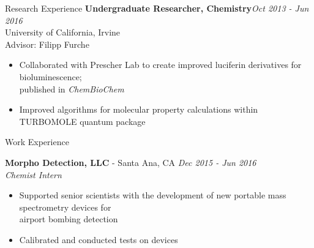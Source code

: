 \documentclass{resume} %
\begin{document}
\begin{rSection}{Research Experience}
\textbf{Undergraduate Researcher, Chemistry}\hfill {\em Oct 2013 - Jun 2016}\\
University of California, Irvine\\
Advisor: Filipp Furche
\vspace{-0.5em}
\begin{itemize}
\itemsep-0.65em
\item Collaborated with Prescher Lab to create improved luciferin derivatives
  for bioluminescence; \\
  published in \textit{ChemBioChem}
\item Improved algorithms for molecular property calculations within TURBOMOLE
  quantum package
\end{itemize}

\end{rSection}

\begin{rSection}{Work Experience}

  {\bf Morpho Detection, LLC} - Santa Ana, CA \hfill {\em Dec 2015 - Jun 2016}  \\
  {\textit{Chemist Intern}}
  \vspace{-0.5em}
  \begin{itemize}
  \itemsep-0.75em
  \item Supported senior scientists with the development of new portable mass
    spectrometry devices for \\
    airport bombing detection
  \item Calibrated and conducted tests on devices
  \end{itemize}  

\end{rSection}

\pagebreak
\end{document}
